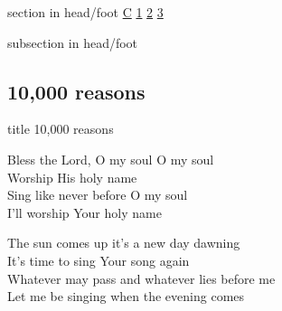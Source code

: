 \documentclass{beamer}
\begin{document}
{
{ 
 {
 \begin{beamercolorbox}[ht=4.5ex,dp=1.5ex,%
      leftskip=.3cm,rightskip=.3cm plus1fil]{section in head/foot}
 \fontsize{12}{25}\selectfont 
\hyperlink{10,000 reasons['Bless the Lord, O my soul']C}{C}
\hyperlink{10,000 reasons['Bless the Lord, O my soul']1}{1}
\hyperlink{10,000 reasons['Bless the Lord, O my soul']2}{2}
\hyperlink{10,000 reasons['Bless the Lord, O my soul']3}{3}
 
 \end{beamercolorbox}%
  \begin{beamercolorbox}[ht=2.5ex,dp=1.125ex,%
   leftskip=.3cm,rightskip=.3cm plus1fil]{subsection in head/foot}
   \insertauthor
 \end{beamercolorbox}%
 }
}
\subsection{ 10,000 reasons }

\hypertarget{10,000 reasons['Bless the Lord, O my soul']}{}
\begin{frame}{}
 \vfill
  \centering
  \begin{beamercolorbox}[sep=8pt,center,shadow=true,rounded=true]{title}
    10,000 reasons    
  \end{beamercolorbox}
  \vfill
\end{frame}

\hypertarget{10,000 reasons['Bless the Lord, O my soul']C}{}
\begin{frame}{}
\fontsize{ 15 }{ 19 }\selectfont

Bless the Lord, O my soul O my soul\\ 
Worship His holy name\\ 
Sing like never before O my soul\\ 
I'll worship Your holy name 

\end{frame}

\hypertarget{10,000 reasons['Bless the Lord, O my soul']1}{}
\begin{frame}{}
\fontsize{ 15 }{ 19 }\selectfont

The sun comes up it's a new day dawning\\ 
It's time to sing Your song again\\ 
Whatever may pass and whatever lies before me\\ 
Let me be singing when the evening comes 


\end{frame}}
\end{document}
